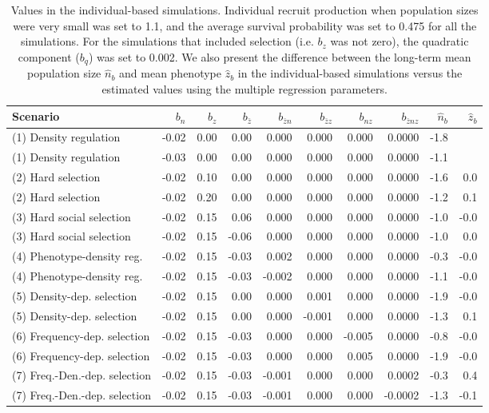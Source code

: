 \begin{table}[ht]
\centering
\begin{tabular}{lrrrrrrrrr}
  \hline
Scenario & $b_{n}$ & $b_{z}$ & $b_{\bar{z}}$ & $b_{\bar{z}n}$ & $b_{\bar{z}z}$ & $b_{nz}$ & $b_{\bar{z}nz}$ & $\hat{n}_{b}$ & $\hat{z}_{b}$ \\ 
  \hline
(1) Density regulation & -0.02 & 0.00 & 0.00 & 0.000 & 0.000 & 0.000 & 0.0000 & -1.8 &  \\ 
  (1) Density regulation & -0.03 & 0.00 & 0.00 & 0.000 & 0.000 & 0.000 & 0.0000 & -1.1 &  \\ 
   (2) Hard selection & -0.02 & 0.10 & 0.00 & 0.000 & 0.000 & 0.000 & 0.0000 & -1.6 & 0.0 \\ 
   (2) Hard selection & -0.02 & 0.20 & 0.00 & 0.000 & 0.000 & 0.000 & 0.0000 & -1.2 & 0.1 \\ 
  (3) Hard social selection & -0.02 & 0.15 & 0.06 & 0.000 & 0.000 & 0.000 & 0.0000 & -1.0 & -0.0 \\ 
  (3) Hard social selection & -0.02 & 0.15 & -0.06 & 0.000 & 0.000 & 0.000 & 0.0000 & -1.0 & 0.0 \\ 
  (4) Phenotype-density reg. & -0.02 & 0.15 & -0.03 & 0.002 & 0.000 & 0.000 & 0.0000 & -0.3 & -0.0 \\ 
  (4) Phenotype-density reg. & -0.02 & 0.15 & -0.03 & -0.002 & 0.000 & 0.000 & 0.0000 & -1.1 & -0.0 \\ 
  (5) Density-dep. selection & -0.02 & 0.15 & 0.00 & 0.000 & 0.001 & 0.000 & 0.0000 & -1.9 & -0.0 \\ 
  (5) Density-dep. selection & -0.02 & 0.15 & 0.00 & 0.000 & -0.001 & 0.000 & 0.0000 & -1.3 & 0.1 \\ 
  (6) Frequency-dep. selection & -0.02 & 0.15 & -0.03 & 0.000 & 0.000 & -0.005 & 0.0000 & -0.8 & -0.0 \\ 
  (6) Frequency-dep. selection & -0.02 & 0.15 & -0.03 & 0.000 & 0.000 & 0.005 & 0.0000 & -1.9 & -0.0 \\ 
  (7) Freq.-Den.-dep. selection & -0.02 & 0.15 & -0.03 & -0.001 & 0.000 & 0.000 & 0.0002 & -0.3 & 0.4 \\ 
  (7) Freq.-Den.-dep. selection & -0.02 & 0.15 & -0.03 & -0.001 & 0.000 & 0.000 & -0.0002 & -1.3 & -0.1 \\ 
   \hline
\end{tabular}
\caption{Values in the individual-based simulations. Individual recruit production when population sizes were very small was set to 1.1, and the average survival probability was set to 0.475 for all the simulations. For the simulations that included selection (i.e. $b_z$ was not zero), the quadratic component ($b_q$) was set to 0.002. We also present the difference between the long-term mean population size $\hat{n}_{b}$ and mean phenotype  $\hat{z}_b$ in the individual-based simulations versus the estimated values using the multiple regression parameters.} 
\end{table}
